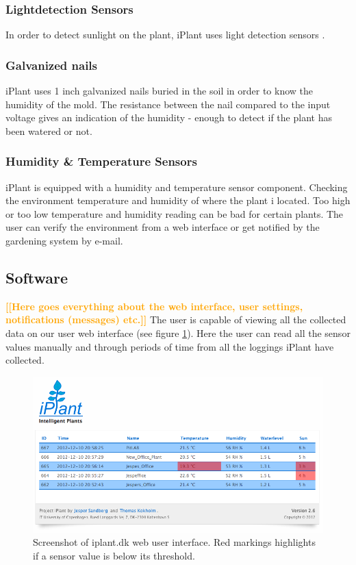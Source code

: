 \documentclass{ubicomp2012}
\newcommand{\todo}[1]{\textsf{\textbf{\textcolor{Orange}{[[#1]]}}}}
\begin{document}
\subsubsection{Lightdetection Sensors}
In order to detect sunlight on the plant, iPlant uses light detection sensors \cite{light-sensors}. 

\subsubsection{Galvanized nails}
iPlant uses 1 inch galvanized nails buried in the soil in order to know the humidity of the mold. The resistance between the nail compared to the input voltage gives an indication of the humidity - enough to detect if the plant has been watered or not.

\subsubsection{Humidity \& Temperature Sensors}
iPlant is equipped with a humidity and temperature sensor component. Checking the environment temperature and humidity of where the plant i located. Too high or too low temperature and humidity reading can be bad for certain plants. The user can verify the environment from a web interface or get notified by the gardening system by e-mail.

\subsection{Software}
\todo{Here goes everything about the web interface, user settings, notifications (messages) etc.}
The user is capable of viewing all the collected data on our user web interface (see figure \ref{fig:web_overview}). Here the user can read all the sensor values manually and through periods of time from all the loggings iPlant have collected. 

\begin{figure}[h!]
\centering
\includegraphics[width=\columnwidth]{web_overview.png}
\caption{Screenshot of iplant.dk web user interface. Red markings highlights if a sensor value is below its threshold.}
\label{fig:web_overview}
\end{figure}
\end{document}

